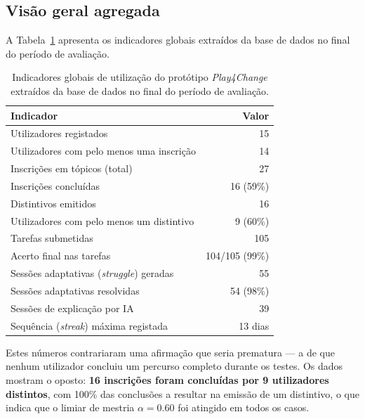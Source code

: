 \subsection*{Visão geral agregada}

A Tabela~\ref{tab:stats-gerais} apresenta os indicadores globais extraídos da base de dados no final do período de avaliação.

\begin{table}[h]
	\centering
	\small
	\begin{tabular}{p{7.5cm} r}
		\toprule
		\textbf{Indicador} & \textbf{Valor} \\
		\midrule
		Utilizadores registados                             & 15 \\
		Utilizadores com pelo menos uma inscrição           & 14 \\
		Inscrições em tópicos (total)                       & 27 \\
		Inscrições concluídas                               & 16 (59\%) \\
		Distintivos emitidos                                & 16 \\
		Utilizadores com pelo menos um distintivo           & 9 (60\%) \\
		Tarefas submetidas                                  & 105 \\
		Acerto final nas tarefas                            & 104/105 (99\%) \\
		Sessões adaptativas (\emph{struggle}) geradas       & 55 \\
		Sessões adaptativas resolvidas                      & 54 (98\%) \\
		Sessões de explicação por IA                        & 39 \\
		Sequência (\emph{streak}) máxima registada          & 13 dias \\
		\bottomrule
	\end{tabular}
	\caption[Indicadores globais de utilização extraídos da base de dados]{Indicadores globais de utilização do protótipo \emph{Play4Change} extraídos da base de dados no final do período de avaliação.}
	\label{tab:stats-gerais}
\end{table}

Estes números contrariaram uma afirmação que seria prematura --- a de que nenhum utilizador concluiu um percurso completo durante os testes. Os dados mostram o oposto: \textbf{16 inscrições foram concluídas por 9 utilizadores distintos}, com 100\% das conclusões a resultar na emissão de um distintivo, o que indica que o limiar de mestria $\alpha = 0.60$ foi atingido em todos os casos.


